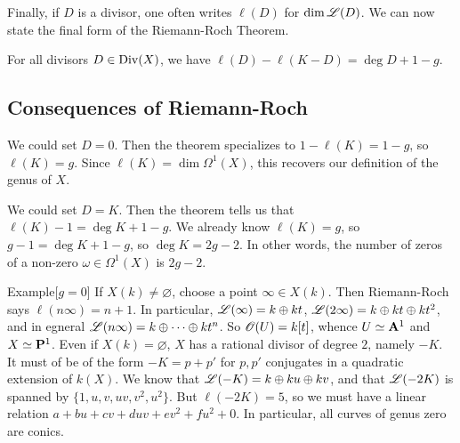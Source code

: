 Finally, if $D$ is a divisor, one often writes $\ell(D)$ for 
$\dim \mathscr{L}(D)$. We can now state the final form of the Riemann-Roch Theorem. 

\begin{theo}
For all divisors $D\in \operatorname{Div}(X)$, we have 
$\ell(D)-\ell(K-D) = \deg D + 1-g$. 
\end{theo}





\subsection{Consequences of Riemann-Roch}

We could set $D=0$. Then the theorem specializes to 
$1-\ell(K)=1-g$, so $\ell(K)=g$. Since $\ell(K)=\dim \Omega^1(X)$, this 
recovers our definition of the genus of $X$. 

We could set $D=K$. Then the theorem tells us that 
$\ell(K)-1 = \deg K+1-g$. We already know $\ell(K)=g$, so 
$g-1=\deg K+1-g$, so $\deg K=2g - 2$. In other words, the number of zeros of 
a non-zero $\omega\in \Omega^1(X)$ is $2 g-2$. 

\begin{enonce}[remark]{Example}[$g=0$]
If $X(k)\ne \varnothing$, choose a point $\infty\in X(k)$. Then Riemann-Roch 
says $\ell(n\infty) = n+1$. In particular, $\mathscr{L}(\infty) = k\oplus k t$, 
$\mathscr{L}(2\infty) = k\oplus k t\oplus k t^2$, and in egneral 
$\mathscr{L}(n\infty) = k\oplus \cdots \oplus k t^n$. So 
$\mathscr{O}(U)=k[t]$, whence $U\simeq \mathbf{A}^1$ and $X\simeq \mathbf{P}^1$. 
Even if $X(k)=\varnothing$, $X$ has a rational divisor of degree $2$, namely 
$-K$. It must of be of the form $-K=p+p'$ for $p,p'$ conjugates in a quadratic 
extension of $k(X)$. We know that $\mathscr{L}(-K)=k\oplus k u\oplus k v$, and that 
$\mathscr{L}(-2 K)$ is spanned by $\{1,u,v,u v,v^2,u^2\}$. But 
$\ell(-2 K)=5$, so we must have a linear relation 
$a+b u+c v+d u v+e v^2 + f u^2 + 0$. In particular, all curves of genus zero 
are conics. 
\end{enonce}

